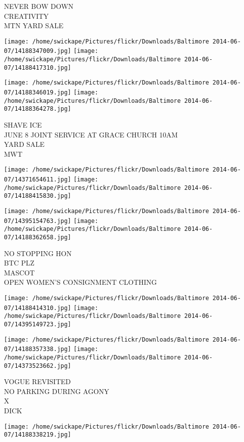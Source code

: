 \documentclass[10pt,letterpaper]{article}
\begin{document}
NEVER BOW DOWN\\
CREATIVITY\\
MTN YARD SALE
\pagebreak

\texttt{[image: /home/swickape/Pictures/flickr/Downloads/Baltimore 2014-06-07/14188347009.jpg]}
\texttt{[image: /home/swickape/Pictures/flickr/Downloads/Baltimore 2014-06-07/14188417310.jpg]}

\texttt{[image: /home/swickape/Pictures/flickr/Downloads/Baltimore 2014-06-07/14188346019.jpg]}
\texttt{[image: /home/swickape/Pictures/flickr/Downloads/Baltimore 2014-06-07/14188364278.jpg]}

SHAVE ICE\\
JUNE 8 JOINT SERVICE AT GRACE CHURCH 10AM\\
YARD SALE\\
MWT
\pagebreak

\texttt{[image: /home/swickape/Pictures/flickr/Downloads/Baltimore 2014-06-07/14371654611.jpg]}
\texttt{[image: /home/swickape/Pictures/flickr/Downloads/Baltimore 2014-06-07/14188415830.jpg]}

\texttt{[image: /home/swickape/Pictures/flickr/Downloads/Baltimore 2014-06-07/14395154763.jpg]}
\texttt{[image: /home/swickape/Pictures/flickr/Downloads/Baltimore 2014-06-07/14188362658.jpg]}

NO STOPPING HON\\
BTC PLZ\\
MASCOT\\
OPEN WOMEN'S CONSIGNMENT CLOTHING
\pagebreak

\texttt{[image: /home/swickape/Pictures/flickr/Downloads/Baltimore 2014-06-07/14188414310.jpg]}
\texttt{[image: /home/swickape/Pictures/flickr/Downloads/Baltimore 2014-06-07/14395149723.jpg]}

\texttt{[image: /home/swickape/Pictures/flickr/Downloads/Baltimore 2014-06-07/14188357338.jpg]}
\texttt{[image: /home/swickape/Pictures/flickr/Downloads/Baltimore 2014-06-07/14373523662.jpg]}

VOGUE REVISITED\\
NO PARKING DURING AGONY\\
X\\
DICK
\pagebreak

\texttt{[image: /home/swickape/Pictures/flickr/Downloads/Baltimore 2014-06-07/14188338219.jpg]}
\end{document}
